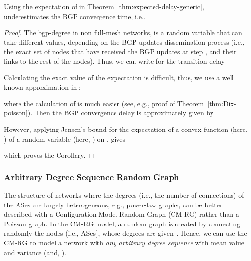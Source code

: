 \begin{corollary}
Using the expectation of  in Theorem~\ref{thm:expected-delay-generic}, underestimates the BGP convergence time, i.e.,

\end{corollary}
\begin{proof}
The bgp-degree  in non full-mesh networks, is a random variable that can take different values, depending on the BGP updates dissemination process (i.e., the exact set of nodes that have received the BGP updates at step , and their links to the rest of the nodes). Thus, we can write for the transition delay 

Calculating the exact value of the expectation  is difficult, thus, we use a well known approximation in :

where the calculation of  is much easier (see, e.g., proof of Theorem~\ref{thm:Dix-poisson}). Then the BGP convergence delay is approximately given by

However, applying Jensen's bound for the expectation of a convex function (here, ) of a random variable (here, ) on , gives

which proves the Corollary.
\end{proof}

\subsubsection{Arbitrary Degree Sequence Random Graph}
The structure of networks where the degrees (i.e., the number of connections) of the ASes are largely heterogeneous, e.g., power-law graphs, can be better described with a Configuration-Model Random Graph (CM-RG) rather than a Poisson graph. In the CM-RG model, a random graph is created by connecting randomly the nodes (i.e., ASes), whose degrees are given~\cite{Newman:Networks-book}. Hence, we can use the CM-RG to model a network with \textit{any arbitrary degree sequence} with mean value  and variance  (and, ).

